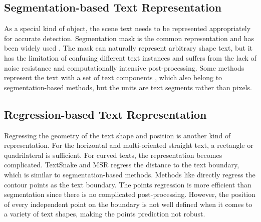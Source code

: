 \documentclass[sigconf]{acmart}
\begin{document}
	\subsection{Segmentation-based Text Representation}
	As a special kind of object, the scene text needs to be represented appropriately for accurate detection. Segmentation mask is the common representation and has been widely used  \cite{deng2018pixellink, wang2019PSENet,tang2017scene,zhou2020crnet, lyu2018masktextspotter,liao2019masktextspotterv2, liao2020masktextspotterv3,liu2019maskTTD, liao2020db,ye2020textfusenet, xiao2020SD, liu2019CSE,liu2018MCN,tian2019SAE,yang2018inceptext, wang2019PAN,qxg2, xu2019textfield,xie2019SPCNet, zhu2021textmountain,cheng2019direct,xue2018border,rong2019unambiguous,guo2022units,wan2021self,qiao2020textperceptron,crafts,qxg3}. The mask can naturally represent arbitrary shape text, but it has the limitation of confusing different text instances
	and suffers from the lack of noise resistance and computationally intensive post-processing. Some methods represent the text with a set of text components  \cite{tian2016CTPN, shi2017SegLink, tang2019seglink++, zhang2020DRRG,ma2021relatext,feng2019textdragon, feng2021residual,cyd1}, which also belong to segmentation-based methods, but the units are text segments rather than pixels.
	
	\subsection{Regression-based Text Representation}
	Regressing the geometry of the text shape and position is another kind of representation. For the horizontal and multi-oriented straight text, a rectangle   \cite{zhang2016multi, zhou2017east, liao2017textboxes,he2017deep,liu2017deep, he2021most, wang2018ITN,he2017multi,qxg1} or quadrilateral  \cite{liao2018rotation, liao2018textboxes++, xue2018border, lyu2018corner,yuan2020follow} is sufficient. 
	For curved texts, the representation becomes complicated. TextSnake  \cite{long2018textsnake}and MSR  \cite{ xue2019msr} regress the distance to the text boundary, which is similar to segmentation-based methods. 
	Methods like  \cite{wang2019ATRR,wang2019boundary, dai2021progressive, zhang2021adaptive} directly regress the contour points as the text boundary. The points regression is more efficient than segmentation since there is no complicated post-processing. However, the position of every independent point on the boundary is not well defined when it comes to a variety of text shapes, making the points prediction not robust.
	
\end{document}
